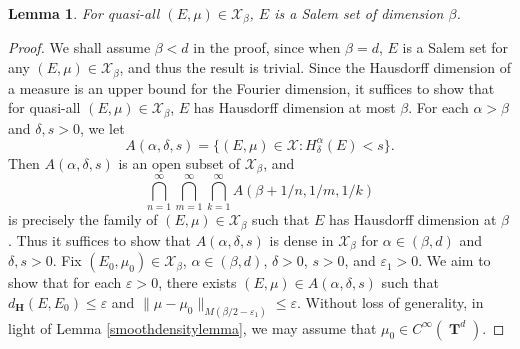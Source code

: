 \documentclass[12pt,reqno]{article}
\numberwithin{equation}{section}
\DeclareMathOperator{\hausdim}{\dim_{\mathbf{H}}}
\DeclareMathOperator{\fordim}{\dim_{\mathbf{F}}}
\DeclareMathOperator{\TT}{\mathbf{T}}
\newtheorem{lemma}[theorem]{Lemma}
\numberwithin{theorem}{section}
\begin{document}
\begin{lemma}
    For quasi-all $(E,\mu) \in \mathcal{X}_\beta$, $E$ is a Salem set of dimension $\beta$.
\end{lemma}
\begin{proof}
    We shall assume $\beta < d$ in the proof, since when $\beta = d$, $E$ is a Salem set for any $(E,\mu) \in \mathcal{X}_\beta$, and thus the result is trivial. Since the Hausdorff dimension of a measure is an upper bound for the Fourier dimension, it suffices to show that for quasi-all $(E,\mu) \in \mathcal{X}_\beta$, $E$ has Hausdorff dimension at most $\beta$. For each $\alpha > \beta$ and $\delta, s > 0$, we let
    \[ A(\alpha,\delta,s) = \{ (E,\mu) \in \mathcal{X}: H^\alpha_\delta(E) < s \}. \]
    Then $A(\alpha,\delta,s)$ is an open subset of $\mathcal{X}_\beta$, and
    \begin{equation}
        \bigcap_{n = 1}^\infty \bigcap_{m = 1}^\infty \bigcap_{k = 1}^\infty A(\beta + 1/n, 1/m, 1/k)
    \end{equation}
    is precisely the family of $(E,\mu) \in \mathcal{X}_\beta$ such that $E$ has Hausdorff dimension at $\beta$.
%
    Thus it suffices to show that $A(\alpha,\delta,s)$ is dense in $\mathcal{X}_\beta$ for $\alpha \in (\beta,d)$ and $\delta, s > 0$. Fix $(E_0,\mu_0) \in \mathcal{X}_\beta$, $\alpha \in (\beta,d)$, $\delta > 0$, $s > 0$, and $\varepsilon_1 > 0$. We aim to show that for each $\varepsilon > 0$, there exists $(E,\mu) \in A(\alpha,\delta,s)$ such that $d_\mathbf{H}(E,E_0) \leq \varepsilon$ and $\| \mu - \mu_0 \|_{M(\beta/2 - \varepsilon_1)} \leq \varepsilon$. Without loss of generality, in light of Lemma \ref{smoothdensitylemma}, we may assume that $\mu_0 \in C^\infty(\TT^d)$.


\end{proof}
\end{document}
